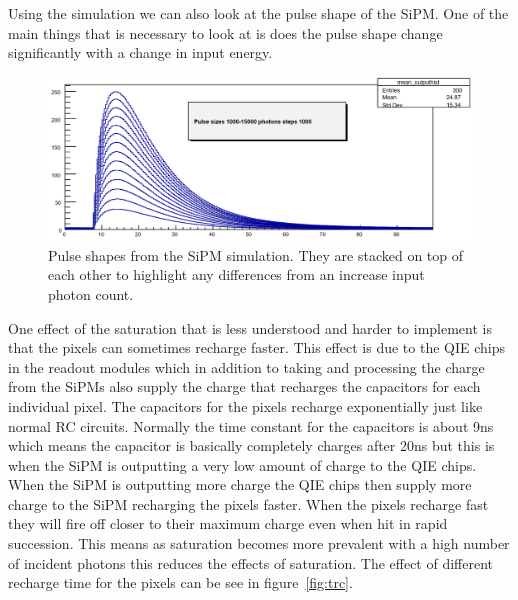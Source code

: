 
Using the simulation we can also look at the pulse shape of the SiPM. One of the main things that is necessary to look at is does the pulse shape change significantly with a change in input energy.

\begin{figure}
\centering
\includegraphics[width=\linewidth]{Figures/SimPul.png}
\caption{Pulse shapes from the SiPM simulation. They are stacked on top of each other to highlight any differences from an increase input photon count.}
\label{fig:SimPul}
\end{figure}


One effect of the saturation that is less understood and harder to implement is that the pixels can sometimes recharge faster. This effect is due to the QIE chips in the readout modules which in addition to taking and processing the charge from the SiPMs also supply the charge that recharges the capacitors for each individual pixel. The capacitors for the pixels recharge exponentially just like normal RC circuits. Normally the time constant for the capacitors is about 9ns which means the capacitor is basically completely charges after 20ns but this is when the SiPM is outputting a very low amount of charge to the QIE chips. When the SiPM is outputting more charge the QIE chips then supply more charge to the SiPM recharging the pixels faster. When the pixels recharge fast they will fire off closer to their maximum charge even when hit in rapid succession. This means as saturation becomes more prevalent with a high number of incident photons this reduces the effects of saturation. The effect of different recharge time for the pixels can be see in figure~\ref{fig:trc}.

